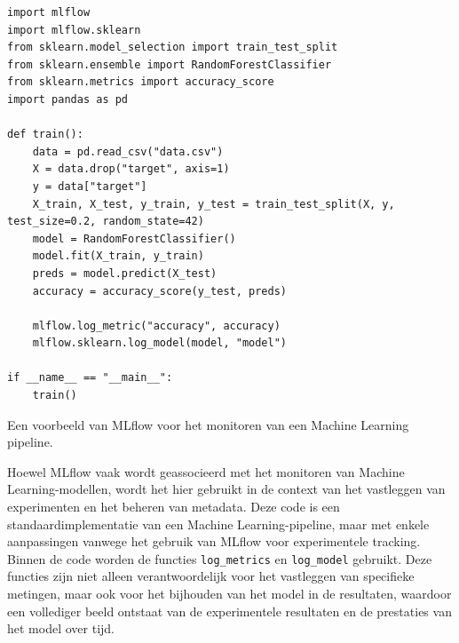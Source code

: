 \begin{listing}
\begin{verbatim}
import mlflow
import mlflow.sklearn
from sklearn.model_selection import train_test_split
from sklearn.ensemble import RandomForestClassifier
from sklearn.metrics import accuracy_score
import pandas as pd

def train():
    data = pd.read_csv("data.csv")
    X = data.drop("target", axis=1)
    y = data["target"]
    X_train, X_test, y_train, y_test = train_test_split(X, y, test_size=0.2, random_state=42)
    model = RandomForestClassifier()
    model.fit(X_train, y_train)
    preds = model.predict(X_test)
    accuracy = accuracy_score(y_test, preds)
    
    mlflow.log_metric("accuracy", accuracy)
    mlflow.sklearn.log_model(model, "model")

if __name__ == "__main__":
    train()
\end{verbatim}
\caption[Voorbeeld van MLflow voor het monitoren van een Machine Learning pipeline.]{\label{code:example-MLflow}Een voorbeeld van MLflow voor het monitoren van een Machine Learning pipeline.}
\end{listing}

Hoewel MLflow vaak wordt geassocieerd met het monitoren van Machine Learning-modellen, wordt het hier gebruikt in de context van het vastleggen van experimenten en het beheren van metadata. Deze code is een standaardimplementatie van een Machine Learning-pipeline, maar met enkele aanpassingen vanwege het gebruik van MLflow voor experimentele tracking.
Binnen de code worden de functies \texttt{log\_metrics} en \texttt{log\_model} gebruikt. Deze functies zijn niet alleen verantwoordelijk voor het vastleggen van specifieke metingen, maar ook voor het bijhouden van het model in de resultaten, waardoor een vollediger beeld ontstaat van de experimentele resultaten en de prestaties van het model over tijd.

